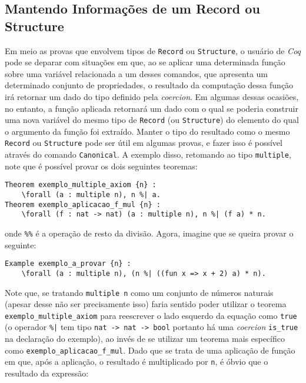 {{%

\subsection{Mantendo Informações de um Record ou Structure}

Em meio as provas que envolvem tipos de \lstinline[language = coq]$Record$ ou \lstinline[language = coq]$Structure$, o usuário de \textit{Coq} pode se deparar com situações em que, ao se aplicar uma determinada função sobre uma variável relacionada a um desses comandos, que apresenta um determinado conjunto de propriedades, o resultado da computação dessa função irá retornar um dado do tipo definido pela \textit{coercion}. Em algumas dessas ocasiões, no entanto, a função aplicada retornará um dado com o qual se poderia construir uma nova variável do mesmo tipo de \lstinline[language = coq]$Record$ (ou \lstinline[language = coq]$Structure$) do elemento do qual o argumento da função foi extraído. Manter o tipo do resultado como o mesmo \lstinline[language = coq]$Record$ ou \lstinline[language = coq]$Structure$ pode ser útil em algumas provas, e fazer isso é possível através do comando \lstinline[language = coq]$Canonical$. A exemplo disso, retomando ao tipo \lstinline[language = coq]$multiple$, note que é possível provar os dois seguintes teoremas:
    \begin{lstlisting}[language = coq,frame=single,tabsize=1]
Theorem exemplo_multiple_axiom {n} :
    \forall (a : multiple n), n %| a.
Theorem exemplo_aplicacao_f_mul {n} :
    \forall (f : nat -> nat) (a : multiple n), n %| (f a) * n.
    \end{lstlisting}
onde \lstinline[language = coq]$%%$ é a operação de resto da divisão. Agora, imagine que se queira provar o seguinte:
    \begin{lstlisting}[language = coq,frame=single,tabsize=1]
Example exemplo_a_provar {n} :
    \forall (a : multiple n), (n %| ((fun x => x + 2) a) * n).
    \end{lstlisting}
Note que, se tratando \lstinline[language = coq]!multiple n! como um conjunto de números naturais (apesar desse não ser precisamente isso) faria sentido poder utilizar o teorema \lstinline[language = coq]!exemplo_multiple_axiom! para reescrever o lado esquerdo da equação como \lstinline[language = coq]!true! (o operador  \lstinline[language = coq]!%|! tem tipo \lstinline[language = coq]!nat -> nat -> bool! portanto há uma \textit{coercion} \lstinline[language = coq]!is_true! na declaração do exemplo), ao invés de se utilizar um teorema mais específico como \lstinline[language = coq]!exemplo_aplicacao_f_mul!. Dado que se trata de uma aplicação de função em que, após a aplicação, o resultado é multiplicado por \lstinline[language = coq]!n!, é óbvio que o resultado da expressão:
}}
